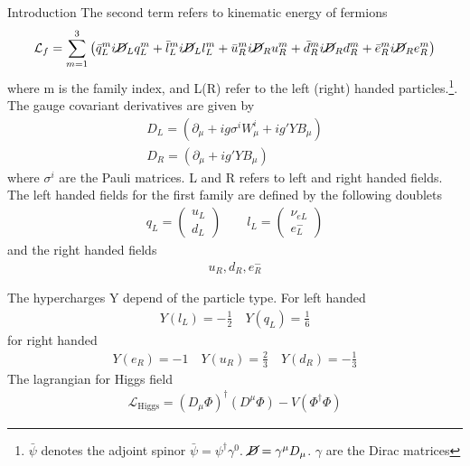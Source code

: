 \begin{chapter}{Introduction}
The second term refers to kinematic energy of fermions 
\begin{align}
\mathcal{L}_f=\sum_{m=1}^{3} \left(\bar{q}^m_{L}i \cancel{D}_L q^m_{L}+  
\bar{l}^m_{L}i \cancel{D}_L l^m_{L} +\bar{u}_{R}^m i \cancel{D}_R u_{R}^m
+\bar{d}_{R}^m i \cancel{D}_R d_{R}^m+\bar{e}_{R}^m i \cancel{D}_R e_{R}^m \right)
\end{align}
where  m is the family index, and L(R)
refer to the left (right) handed particles.\footnote{$\bar{\psi}$ denotes the adjoint spinor $\bar{\psi}=\psi^\dagger \gamma^0$.
$\cancel{D}=\gamma^\mu D_\mu$. $\gamma$ are the Dirac matrices}. 
The gauge covariant derivatives  are given by
\begin{align}
{D}_L =\left(\partial_\mu+ig\sigma^iW^i_\mu +ig'Y B_\mu\right)\\
{D}_R =\left(\partial_\mu +ig' Y B_\mu\right)
\end{align}
where $\sigma^i$ are the Pauli matrices. L and R refers to left and right handed fields.
The left handed fields for the first family are defined by the following doublets
\begin{align}
    q_L=\left(\begin{array}{c}
 u_L \\
d_L
\end{array} \right) \qquad   l_L=\left(\begin{array}{c}
 \nu_{eL} \\
e^-_L
\end{array} \right)
\end{align}
and the right handed fields
\begin{align}
   u_R,d_R,e^-_R 
\end{align}

The hypercharges Y depend of the particle type. For left handed 
\begin{align}
    Y(l_L)=-\frac{1}{2} \quad Y(q_L)=\frac{1}{6} 
 \end{align}
 for right handed 
 \begin{align}
Y(e_R)=-1  \quad Y(u_R)=\frac{2}{3} \quad Y(d_R)=-\frac{1}{3}
\end{align}
The lagrangian for Higgs field
\begin{align}
\mathcal{L}_{\text{Higgs}}=(D_\mu \Phi)^\dagger (D^\mu \Phi)-V(\Phi^\dagger \Phi)
\end{align}


\end{chapter}

